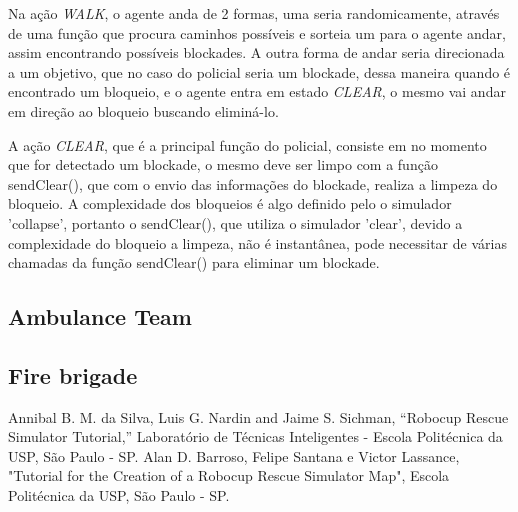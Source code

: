 \documentclass[conference]{IEEEtran}
\begin{document}
Na ação \textit{WALK}, o agente anda de 2 formas, uma seria randomicamente, através de uma função que procura caminhos possíveis e sorteia um para o agente andar, assim encontrando possíveis blockades. A outra forma de andar seria direcionada a um objetivo, que no caso do policial seria um blockade, dessa maneira quando é encontrado um bloqueio, e o agente entra em estado \textit{CLEAR}, o mesmo vai andar em direção ao bloqueio buscando eliminá-lo.

A ação \textit{CLEAR}, que é a principal função do policial, consiste em no momento que for detectado um blockade, o mesmo deve ser limpo com a função sendClear(), que com o envio das informações do blockade, realiza a limpeza do bloqueio. A complexidade dos bloqueios é algo definido pelo o simulador 'collapse', portanto o sendClear(), que utiliza o simulador 'clear', devido a complexidade do bloqueio a limpeza, não é instantânea, pode necessitar de várias chamadas da função sendClear() para eliminar um blockade.
\subsection{Ambulance Team}

\subsection{Fire brigade}

\begin{thebibliography}{00}
 Annibal B. M. da Silva, Luis G. Nardin and Jaime S. Sichman, ``Robocup Rescue Simulator Tutorial,'' Laboratório de Técnicas Inteligentes - Escola Politécnica da USP, São Paulo - SP.
 Alan D. Barroso, Felipe Santana e Victor Lassance, "Tutorial for the Creation of a Robocup Rescue Simulator Map", Escola Politécnica da USP, São Paulo - SP.

\end{thebibliography}
\end{document}
